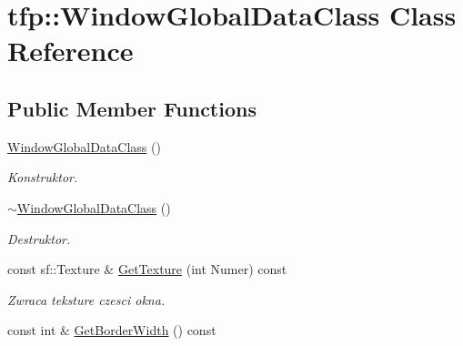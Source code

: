 \hypertarget{classtfp_1_1_window_global_data_class}{}\section{tfp\+:\+:Window\+Global\+Data\+Class Class Reference}
\label{classtfp_1_1_window_global_data_class}
\subsection*{Public Member Functions}
\begin{DoxyCompactItemize}
\item 
\mbox{\label{classtfp_1_1_window_global_data_class_ac6908b43cf566c1cd56a9db4f24048ff}} 
\mbox{\hyperlink{classtfp_1_1_window_global_data_class_ac6908b43cf566c1cd56a9db4f24048ff}{Window\+Global\+Data\+Class}} ()
\begin{DoxyCompactList}\small\item\em Konstruktor. \end{DoxyCompactList}\item 
\mbox{\label{classtfp_1_1_window_global_data_class_a4ed03ce44841b82204a87ea1985155fc}} 
\mbox{\hyperlink{classtfp_1_1_window_global_data_class_a4ed03ce44841b82204a87ea1985155fc}{$\sim$\+Window\+Global\+Data\+Class}} ()
\begin{DoxyCompactList}\small\item\em Destruktor. \end{DoxyCompactList}\item 
\mbox{\label{classtfp_1_1_window_global_data_class_a8bd4afee9109c004d6ec8ead010bc62c}} 
const sf\+::\+Texture \& \mbox{\hyperlink{classtfp_1_1_window_global_data_class_a8bd4afee9109c004d6ec8ead010bc62c}{Get\+Texture}} (int Numer) const
\begin{DoxyCompactList}\small\item\em Zwraca teksture czesci okna. \end{DoxyCompactList}\item 
\mbox{\label{classtfp_1_1_window_global_data_class_a6300aff979c6e078272ac2a416c52d3f}} 
const int \& \mbox{\hyperlink{classtfp_1_1_window_global_data_class_a6300aff979c6e078272ac2a416c52d3f}{Get\+Border\+Width}} () const

\end{DoxyCompactItemize}
